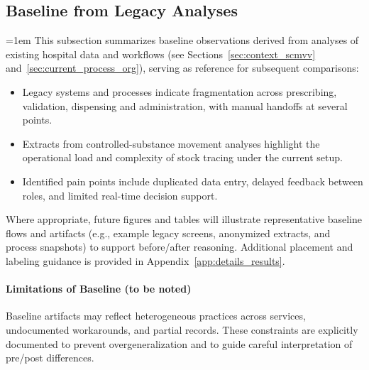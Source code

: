 \subsection{Baseline from Legacy Analyses}
\begingroup\emergencystretch=1em
This subsection summarizes baseline observations derived from analyses of existing hospital data and workflows (see Sections~\ref{sec:context_scmvv} and~\ref{sec:current_process_org}), serving as reference for subsequent comparisons:
\begin{itemize}
    \item Legacy systems and processes indicate fragmentation across prescribing, validation, dispensing and administration, with manual handoffs at several points.
    \item Extracts from controlled-substance movement analyses highlight the operational load and complexity of stock tracing under the current setup.
    \item Identified pain points include duplicated data entry, delayed feedback between roles, and limited real-time decision support.
\end{itemize}
Where appropriate, future figures and tables will illustrate representative baseline flows and artifacts (e.g., example legacy screens, anonymized extracts, and process snapshots) to support before/after reasoning.
Additional placement and labeling guidance is provided in Appendix~\ref{app:details_results}.
\endgroup

\paragraph{Limitations of Baseline (to be noted)}
Baseline artifacts may reflect heterogeneous practices across services, undocumented workarounds, and partial records. These constraints are explicitly documented to prevent overgeneralization and to guide careful interpretation of pre/post differences.

